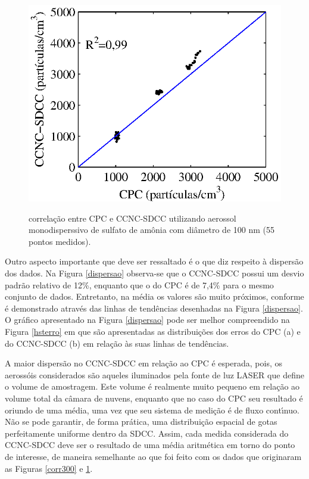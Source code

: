 \begin{figure}[hbt]
\begin{center}
\includegraphics[scale=0.9]{GraficosMatlab/corr_100nm.eps}\\
\end{center}
\caption{\label{corr100}\hspace{-0.1em} correla\c{c}\~{a}o entre CPC e CCNC-SDCC utilizando aerossol monodisperssivo de sulfato de am\^{o}nia com di\^{a}metro de 100 nm (55 pontos medidos).}
\end{figure}

Outro aspecto importante que deve ser ressaltado \'{e} o que diz respeito \`{a} dispers\~{a}o dos dados. Na Figura \ref{dispersao} observa-se que o CCNC-SDCC possui um desvio padr\~{a}o relativo de 12\%, enquanto que o do CPC \'{e} de 7,4\% para o mesmo conjunto de dados.  Entretanto, na m\'{e}dia os valores s\~{a}o muito pr\'{o}ximos, conforme \'{e} demonstrado atrav\'{e}s das linhas de tend\^{e}ncias desenhadas na Figura \ref{dispersao}. O gr\'{a}fico apresentado na Figura \ref{dispersao} pode ser melhor compreendido na Figura \ref{hsterro} em que s\~{a}o apresentadas as distribui\c{c}\~{o}es dos erros do CPC (a) e do CCNC-SDCC (b) em rela\c{c}\~{a}o \`{a}s suas linhas de tend\^{e}ncias.


 A maior dispers\~{a}o no CCNC-SDCC em rela\c{c}\~{a}o ao CPC \'{e} esperada, pois, os aeross\'{o}is considerados s\~{a}o aqueles iluminados pela fonte de luz LASER que define o volume de amostragem.  Este volume \'{e} realmente  muito pequeno em rela\c{c}\~{a}o ao volume total da c\^{a}mara de nuvens, enquanto que no caso do CPC seu resultado \'{e} oriundo de uma m\'{e}dia, uma vez que seu sistema de medi\c{c}\~{a}o \'{e} de fluxo cont\'{\i}nuo. N\~{a}o se pode garantir, de forma pr\'{a}tica, uma distribui\c{c}\~{a}o espacial de gotas perfeitamente uniforme dentro da SDCC. Assim, cada medida considerada do CCNC-SDCC deve ser o resultado de uma m\'{e}dia aritm\'{e}tica em torno do ponto de interesse, de maneira semelhante ao que foi feito com os dados que originaram as Figuras \ref{corr300} e \ref{corr100}.


